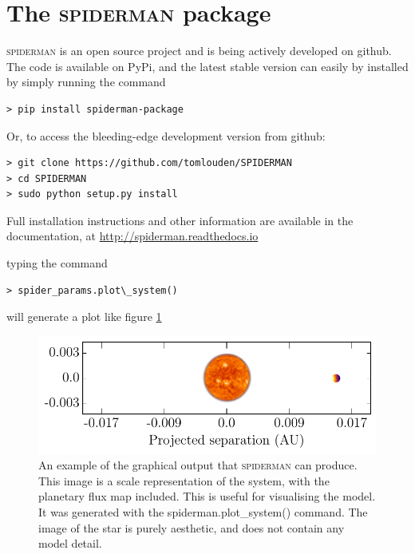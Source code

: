 \documentclass[a4paper,fleqn,usenatbib]{mnras}
\begin{document}
\section{The \textsc{spiderman} package}\label{sec:package}

\textsc{spiderman} is an open source project and is being actively developed on github. The code is available on PyPi, and the latest stable version can easily by installed by simply running the command 

\begin{Verbatim}[frame=single]
> pip install spiderman-package
\end{Verbatim}

Or, to access the bleeding-edge development version from github:

\begin{Verbatim}[frame=single]
> git clone https://github.com/tomlouden/SPIDERMAN
> cd SPIDERMAN
> sudo python setup.py install
\end{Verbatim}

Full installation instructions and other information are available in the documentation, at \url{http://spiderman.readthedocs.io}


typing the command

\begin{Verbatim}[frame=single]
> spider_params.plot\_system()
\end{Verbatim}

will generate a plot like figure \ref{fig:plot_system}

\begin{figure}
\begin{center}
\includegraphics[width=\columnwidth]{img/system.pdf}
\caption{An example of the graphical output that \textsc{spiderman} can produce. This image is a scale representation of the system, with the planetary flux map included. This is useful for visualising the model. It was generated with the spiderman.plot\_system() command. The image of the star is purely aesthetic, and does not contain any model detail.}
\label{fig:plot_system}
\end{center}
\end{figure}
\end{document}
